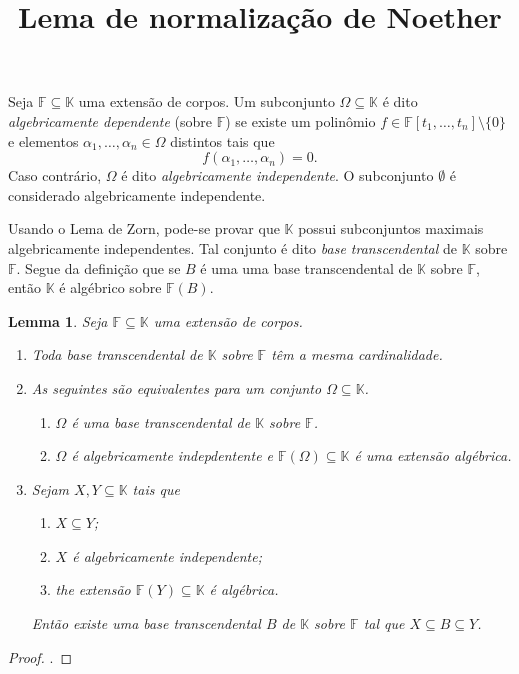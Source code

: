 \documentclass[12pt]{amsart}
\newcommand{\F}{\mathbb F}
\newcommand{\K}{\mathbb K}
\newtheorem{lemma}[theorem]{Lemma}
\begin{document}
\title{Lema de normalização de Noether}
\maketitle

Seja $\F\subseteq\K$ uma extensão de corpos.
Um subconjunto $\Omega\subseteq \K$ é 
dito {\em algebricamente dependente} (sobre $\F$) se existe um polinômio $f\in\F[t_1,\ldots,t_n]\setminus\{0\}$
e elementos $\alpha_1,\ldots,\alpha_n\in\Omega$ distintos tais que 
\[ 
    f(\alpha_1,\ldots,\alpha_n)=0.
\] 
Caso 
contrário, $\Omega$ é dito {\em algebricamente independente}. O subconjunto $\emptyset$ é considerado algebricamente independente.

Usando o Lema de Zorn, pode-se provar que $\K$ possui subconjuntos maximais algebricamente independentes. 
Tal conjunto é dito {\em base transcendental} de $\K$ sobre $\F$. Segue da definição que se $B$ é uma uma base 
transcendental de $\K$ sobre $\F$, então $\K$ é algébrico sobre $\F(B)$.  

\begin{lemma}\label{lem:bas_tr}
    Seja $\F\subseteq\K$ uma extensão de corpos. 
    \begin{enumerate}
        \item Toda base transcendental de $\K$ sobre $\F$ têm a mesma 
    cardinalidade. 
    \item As seguintes são equivalentes para um conjunto $\Omega\subseteq \K$.
\begin{enumerate}
    \item $\Omega$ é uma base transcendental de $\K$ sobre $\F$.
    \item $\Omega$ é algebricamente indepdentente e $\F(\Omega)\subseteq \K$ é uma extensão algébrica. 
\end{enumerate}
\item 
Sejam $X,Y\subseteq \K$ tais que  
    \begin{enumerate}
        \item[(c)] $X\subseteq Y$;
        \item[(d)] $X$ é algebricamente independente;
        \item[(e)] the extensão $\F(Y)\subseteq \K$ é algébrica. 
    \end{enumerate}
    Então existe uma base transcendental $B$ de $\K$ sobre $\F$ tal que $X\subseteq B\subseteq Y$. 
\end{enumerate}
\end{lemma}
\begin{proof}
    \cite{}.
\end{proof}
\end{document}

